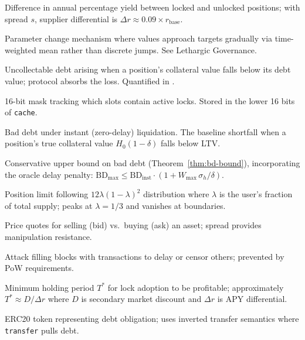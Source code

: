 \documentclass[10pt,a4paper,twocolumn]{article}
\begin{document}
\begin{description}[style=nextline, leftmargin=2.5em, labelindent=0em, font=\normalfont\bfseries]
\item[APY Differential] Difference in annual percentage yield between locked and unlocked positions; with spread $s$, supplier differential is $\Delta r \approx 0.09 \times r_{\text{base}}$.

\item[Asymptotic Transition] Parameter change mechanism where values approach targets gradually via time-weighted mean rather than discrete jumps. See Lethargic Governance.


\item[Bad Debt] Uncollectable debt arising when a position's collateral value falls below its debt value; protocol absorbs the loss. Quantified in \cite{sim}.

\item[Bitmap] 16-bit mask tracking which slots contain active locks. Stored in the lower 16 bits of \texttt{cache}.

\item[$\text{BD}_{\text{inst}}$\,$\dagger$] Bad debt under instant (zero-delay) liquidation. The baseline shortfall when a position's true collateral value $H_0(1{-}\delta)$ falls below LTV.

\item[$\text{BD}_{\max}$\,$\dagger$] Conservative upper bound on bad debt (Theorem~\ref{thm:bd-bound}), incorporating the oracle delay penalty: $\text{BD}_{\max} \leq \text{BD}_{\text{inst}} \cdot (1 + W_{\max}\,\sigma_h / \delta)$.

\item[Beta Cap] Position limit following \mbox{$12\lambda(1-\lambda)^2$} distribution where $\lambda$ is the user's fraction of total supply; peaks at $\lambda = 1/3$ and vanishes at boundaries.

\item[Bid/Ask] Price quotes for selling (bid) vs.\ buying (ask) an asset; spread provides manipulation resistance.

\item[Block Stuffing] Attack filling blocks with transactions to delay or censor others; prevented by PoW requirements.

\item[Breakeven Period] Minimum holding period $T^*$ for lock adoption to be profitable; approximately $T^* \approx D / \Delta r$ where $D$ is secondary market discount and $\Delta r$ is APY differential.

\item[Borrow Position] ERC20 token representing debt obligation; uses inverted transfer semantics where \texttt{transfer} pulls debt.


\end{description}
\end{document}
